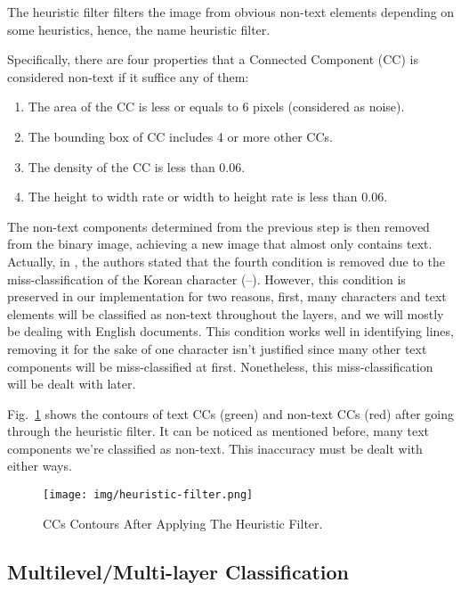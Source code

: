 \documentclass[conference]{IEEEtran}
\begin{document}
    The heuristic filter filters the image from obvious non-text elements depending on some heuristics, hence, the name
    heuristic filter.

    Specifically, there are four properties that a Connected Component (CC) is considered non-text if it suffice any of them:
    \begin{enumerate}
        \item The area of the CC is less or equals to 6 pixels (considered as noise).
        \item The bounding box of CC includes 4 or more other CCs.
        \item The density of the CC is less than 0.06.
        \item The height to width rate or width to height rate is less than 0.06.
    \end{enumerate}
    
    The non-text components determined from the previous step is then removed from the binary image, achieving a new image
    that almost only contains text.
    Actually, in \cite{mhs}, the authors stated that the fourth condition is removed due to the miss-classification of the Korean
    character (--).
    However, this condition is preserved in our implementation for two reasons, first, many characters and text
    elements will be classified as non-text throughout the layers, and we will mostly be dealing with English documents.
    This condition works well in identifying lines, removing it for the sake of one character isn't justified since many other text
    components will be miss-classified at first. Nonetheless, this miss-classification will be dealt with later.

    Fig.~\ref{img:heuristic-filter} shows the contours of text CCs (green) and non-text CCs (red) after going through the heuristic filter.
    It can be noticed as mentioned before, many text components we're classified as non-text.
    This inaccuracy must be dealt with either ways.

    \begin{figure}[htbp]
        \centerline{\texttt{[image: img/heuristic-filter.png]}}
        \caption{CCs Contours After Applying The Heuristic Filter.}
        \label{img:heuristic-filter}
    \end{figure}


    \subsection{Multilevel/Multi-layer Classification}
\end{document}
